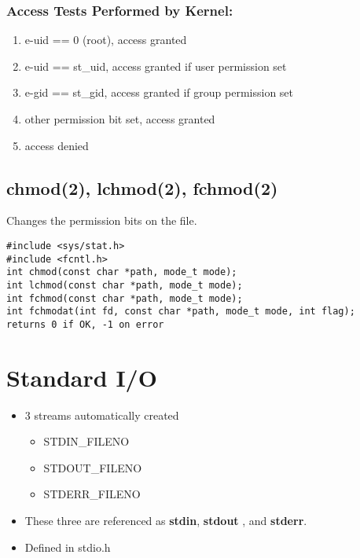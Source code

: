 \documentclass[10pt]{article}
\begin{document}
\begin{multicols}{2}
\begin{minipage}{0.8\columnwidth}
        \subsubsection*{Access Tests Performed by Kernel:}
        \begin{enumerate}
            \item e-uid == 0 (root), access granted
            \item e-uid == st\_uid, access granted if user permission set
            \item e-gid == st\_gid, access granted if group permission set
            \item other permission bit set, access granted
            \item access denied
        \end{enumerate}
    \end{minipage}
    \begin{minipage}{\columnwidth}
        \vspace*{3em}
        \begin{flushright}
            \subsection*{chmod(2), lchmod(2), fchmod(2)}
            Changes the permission bits on the file.
            \footnotesize
            \begin{lstlisting}
#include <sys/stat.h>
#include <fcntl.h>
int chmod(const char *path, mode_t mode);
int lchmod(const char *path, mode_t mode);
int fchmod(const char *path, mode_t mode);
int fchmodat(int fd, const char *path, mode_t mode, int flag);
returns 0 if OK, -1 on error
            \end{lstlisting}
            \vspace*{-1em}
            \section*{Standard I/O}
            \begin{multicols*}{2}
                \begin{itemize}
                    \item 3 streams automatically created
                          \begin{itemize}
                              \item STDIN\_FILENO
                              \item STDOUT\_FILENO
                              \item STDERR\_FILENO
                          \end{itemize}
                          \columnbreak
                    \item These three are referenced as \textbf{stdin}, \textbf{stdout}
                          , and \textbf{stderr}.
                    \item Defined in stdio.h
                \end{itemize}
            \end{multicols*}
            \vspace*{-5em}

\end{flushright}
\end{minipage}
\end{multicols}
\end{document}
